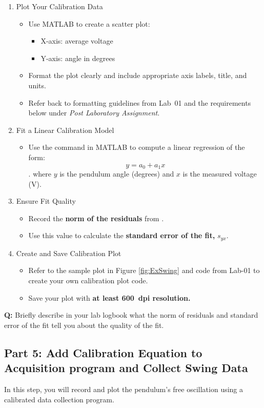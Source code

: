 \documentclass{article}
\begin{document}
\begin{enumerate}[resume]
    \item Plot Your Calibration Data
    \begin{itemize}
        \item Use MATLAB to create a scatter plot:
        \begin{itemize}
            \item X-axis: average voltage
            \item Y-axis: angle in degrees
        \end{itemize}
        \item Format the plot clearly and include appropriate axis labels, title, and units.
        \item Refer back to formatting guidelines from Lab~01 and the requirements below under \textit{Post Laboratory Assignment}.
    \end{itemize}
    \item Fit a Linear Calibration Model
    \begin{itemize}
        \item Use the  command in MATLAB to compute a linear regression of the form: \[y = {a_0} + {a_1}x\]. where $y$ is the pendulum angle (degrees) and $x$ is the measured voltage (V).
    \end{itemize}
    \item Ensure Fit Quality
    \begin{itemize}
        \item Record the \textbf{norm of the residuals} from .
        \item Use this value to calculate the \textbf{standard error of the fit,} $s_{yx}$.
    \end{itemize}
    \item Create and Save Calibration Plot
    \begin{itemize}
        \item Refer to the sample plot in Figure \ref{fig:ExSwing} and code from Lab-01 to create your own calibration plot code.
        \item Save your plot with \textbf{at least 600~dpi resolution.}
    \end{itemize}
\end{enumerate}
\textbf{Q:} Briefly describe in your lab logbook what the norm of residuals and standard error of the fit tell you about the quality of the fit.

\subsection{Part 5: Add Calibration Equation to Acquisition program and Collect Swing Data}
In this step, you will record and plot the pendulum’s free oscillation using a calibrated data collection program.  
\end{document}
